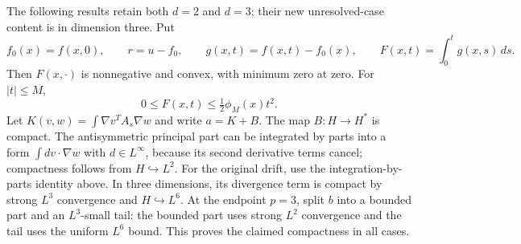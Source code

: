 \documentclass[11pt,a4paper]{article}
\newcommand{\abs}[1]{\left\lvert#1\right\rvert}
\theoremstyle{definition}
\theoremstyle{remark}
\numberwithin{equation}{section}
\begin{document}
The following results retain both $d=2$ and $d=3$; their new unresolved-case content is in dimension three. Put
\[
 f_0(x)=f(x,0),\qquad r=u-f_0,\qquad
 g(x,t)=f(x,t)-f_0(x),\qquad F(x,t)=\int_0^t g(x,s)\,ds.
\]
Then $F(x,\cdot)$ is nonnegative and convex, with minimum zero at zero. For $\abs{t}\le M$,
\begin{equation}\label{eq:gal-local-potential-bound}
 0\le F(x,t)\le\tfrac12\phi_M(x)t^2.
\end{equation}
Let $K(v,w)=\int\nabla v^T A_s\nabla w$ and write $a=K+B$. The map $B:H\to H^*$ is compact. The antisymmetric principal part can be integrated by parts into a form $\int dv\cdot\nabla w$ with $d\in L^\infty$, because its second derivative terms cancel; compactness follows from $H\hookrightarrow L^2$. For the original drift, use the integration-by-parts identity above. In three dimensions, its divergence term is compact by strong $L^3$ convergence and $H\hookrightarrow L^6$. At the endpoint $p=3$, split $b$ into a bounded part and an $L^3$-small tail: the bounded part uses strong $L^2$ convergence and the tail uses the uniform $L^6$ bound. This proves the claimed compactness in all cases.
\end{document}
